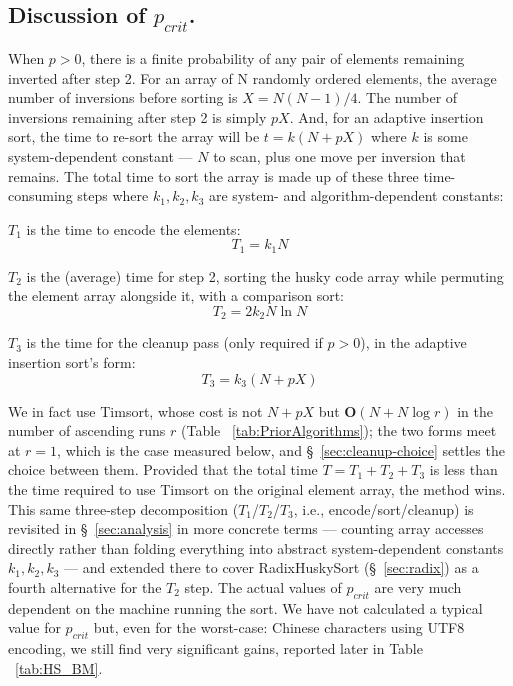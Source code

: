 \documentclass[twoside,leqno,twocolumn]{article}
\begin{document}
\subsection{Discussion of \texorpdfstring{$p_{crit}$}{p\_crit}.}
\label{sec:pcrit}
When $p > 0$, there is a finite probability of any pair of elements remaining inverted after step 2.
For an array of N randomly ordered elements, the average number of inversions before sorting is $X = N (N -1 ) / 4$.
The number of inversions remaining after step 2 is simply $p X$.
And, for an adaptive insertion sort, the time to re-sort the array will be $t = k (N + p X)$ where
$k$ is some system-dependent constant --- $N$ to scan, plus one move per inversion that remains.
The total time to sort the array is made up of these three time-consuming steps where $k_1, k_2, k_3$ are system- and algorithm-dependent constants:

\begin{steps}
 \item{} $T_1$ is the time to encode the elements:
\[T_1 = k_1 N\]
\item{}  $T_2$ is the (average) time for step 2, sorting the husky code array while permuting the
element array alongside it, with a comparison sort:
\[T_2 = 2 k_2 N \ln N\]
\item{}  $T_3$ is the time for the cleanup pass (only required if $p>0$), in the adaptive
insertion sort's form:
 \[T_3 = k_3 (N + p X)\]
\end{steps}
We in fact use Timsort, whose cost is not $N + p X$ but $\textbf{O}(N + N \log r)$ in the number of
ascending runs $r$ (Table ~\ref{tab:PriorAlgorithms}); the two forms meet at $r = 1$, which is the
case measured below, and \S~\ref{sec:cleanup-choice} settles the choice between them.
Provided that the total time $T = T_1 + T_2 + T_3$ is less than the time required to use Timsort on the original element array,
the method wins.
This same three-step decomposition ($T_1$/$T_2$/$T_3$, i.e., encode/sort/cleanup) is revisited in \S~\ref{sec:analysis}
in more concrete terms —
counting array accesses directly rather than folding everything into abstract system-dependent constants $k_1, k_2, k_3$ —
and extended there to cover RadixHuskySort (\S~\ref{sec:radix}) as a fourth alternative for the $T_2$ step.
The actual values of $p_{crit}$ are very much dependent on the machine running the sort.
We have not calculated a typical value for $p_{crit}$ but, even for the worst-case:
Chinese characters using UTF8 encoding, we still find very significant gains, reported later in Table ~\ref{tab:HS_BM}.
\end{document}
